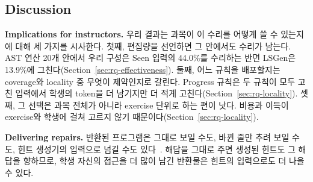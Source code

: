 \documentclass[10pt,conference]{IEEEtran}
\begin{document}
\subsection{Discussion}

\noindent\textbf{Implications for instructors.} 우리 결과는 과목이 이 수리를 어떻게 쓸 수 있는지에 대해 세 가지를 시사한다. 첫째, 편집량을 선언하면 그 안에서도 수리가 남는다. AST 연산 20개 안에서 우리 구성은 Seen 입력의 44.0\%를 수리하는 반면 LSGen은 13.9\%에 그친다(Section~\ref{sec:rq-effectiveness}). 둘째, 어느 규칙을 배포할지는 coverage와 locality 중 무엇이 제약인지로 갈린다. Progress 규칙은 두 규칙이 모두 고친 입력에서 학생의 token을 더 남기지만 더 적게 고친다(Section~\ref{sec:rq-locality}). 셋째, 그 선택은 과목 전체가 아니라 exercise 단위로 하는 편이 낫다. 비용과 이득이 exercise와 학생에 걸쳐 고르지 않기 때문이다(Section~\ref{sec:rq-locality}).

\noindent\textbf{Delivering repairs.} 반환된 프로그램은 그대로 보일 수도, 바뀐 줄만 추려 보일 수도, 힌트 생성기의 입력으로 넘길 수도 있다~\cite{phung2023generating,roest2024next}. 해답을 그대로 주면 생성된 힌트도 그 해답을 향하므로, 학생 자신의 접근을 더 많이 남긴 반환물은 힌트의 입력으로도 더 나을 수 있다.
\end{document}
